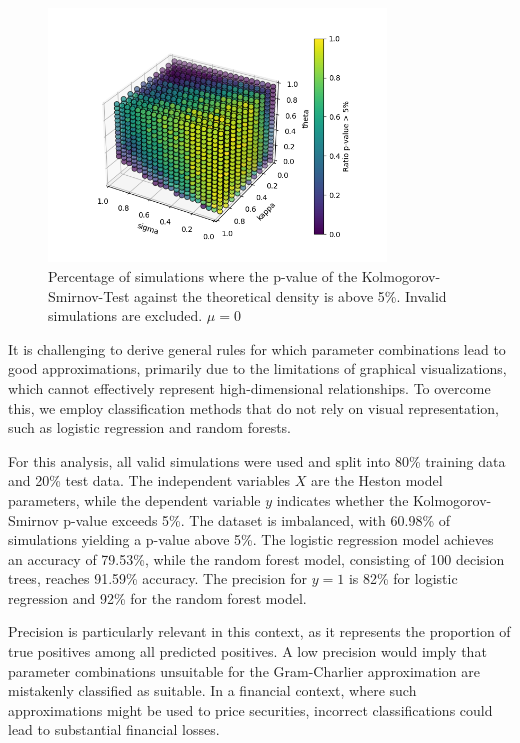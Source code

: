\begin{figure}
    \centering
    \includegraphics[width=0.8\textwidth]{img/GC_cum_KS_3d_p_value_sigma_kappa_theta_muzero.png}
    \caption{Percentage of simulations where the p-value of the Kolmogorov-Smirnov-Test against the theoretical density is above 5\%. Invalid simulations are excluded. $\mu=0$}
    \label{fig:GC_cum_KS_3d_p_value_sigma_kappa_theta_muzero}
\end{figure}

It is challenging to derive general rules for which parameter combinations lead to good approximations, primarily due to the limitations of graphical visualizations, which cannot effectively represent high-dimensional relationships. To overcome this, we employ classification methods that do not rely on visual representation, such as logistic regression and random forests.

For this analysis, all valid simulations were used and split into 80\% training data and 20\% test data. The independent variables $X$ are the Heston model parameters, while the dependent variable $y$ indicates whether the Kolmogorov-Smirnov p-value exceeds 5\%. The dataset is imbalanced, with 60.98\% of simulations yielding a p-value above 5\%. The logistic regression model achieves an accuracy of 79.53\%, while the random forest model, consisting of 100 decision trees, reaches 91.59\% accuracy. The precision for $y = 1$ is 82\% for logistic regression and 92\% for the random forest model.

Precision is particularly relevant in this context, as it represents the proportion of true positives among all predicted positives. A low precision would imply that parameter combinations unsuitable for the Gram-Charlier approximation are mistakenly classified as suitable. In a financial context, where such approximations might be used to price securities, incorrect classifications could lead to substantial financial losses.

